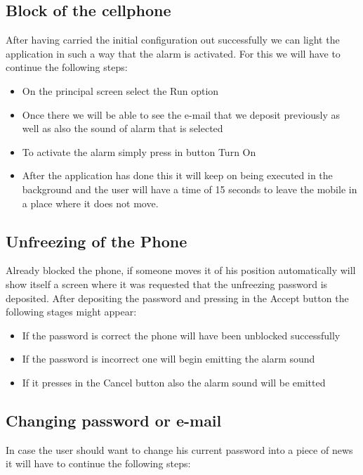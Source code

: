 \documentclass[12pt,letterpaper]{article}
\begin{document}
\subsection{Block of the cellphone}
\begin{raggedleft}
After having carried the initial configuration out successfully we can light the application in such a way that the alarm is activated. For this we will have to continue the following steps:
\end{raggedleft}

 \begin{itemize}

\item{On the principal screen select the Run option}
\item{Once there we will be able to see the e-mail that we deposit previously as well as also the sound of alarm that is selected}
\item{To activate the alarm simply press in button Turn On}
\item{After the application has done this it will keep on being executed in the background and the user will have a time of 15 seconds to leave the mobile in a place where it does not move.}

\end{itemize}



\subsection{Unfreezing of the Phone}
Already blocked the phone, if someone moves it of his position automatically will show itself a screen where it was requested that the unfreezing password is deposited. After depositing the password and pressing in the Accept button the following stages might appear:

 \begin{itemize}

\item{If the password is correct the phone will have been unblocked successfully}
\item{If the password is incorrect one will begin emitting the alarm sound}
\item{If it presses in the Cancel button also the alarm sound will be emitted}

\end{itemize}



\subsection{Changing password or e-mail}
In case the user should want to change his current password into a piece of news it will have to continue the following steps:
\end{document}
